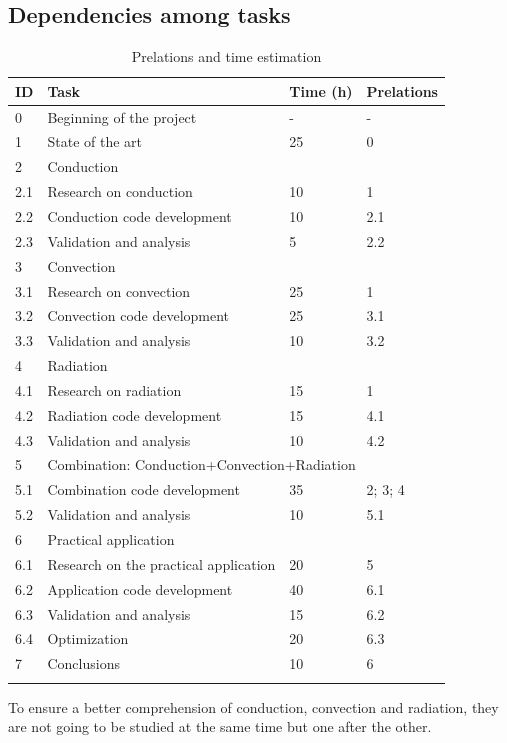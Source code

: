 \subsection{Dependencies among tasks}
\begin{longtable}{ | p{1.3cm} | p{7cm} | p{3cm} | p{3.5cm} |}
\hline

\textbf{ID }& \textbf{Task} & \textbf{Time (h)} & \textbf{Prelations} \\ \hline
0 & Beginning of the project & - & -  \\ \hline
1 & State of the art & 25 & 0 \\ \hline
2 & \multicolumn{3}{|l|}{Conduction} \\ \hline
2.1 & Research on conduction & 10 & 1 \\ \hline
2.2 & Conduction code development & 10 & 2.1 \\ \hline
2.3 & Validation and analysis & 5 & 2.2 \\ \hline
3 & \multicolumn{3}{|l|}{Convection} \\ \hline
3.1 & Research on convection & 25 & 1 \\ \hline
3.2 & Convection code development & 25 & 3.1 \\ \hline
3.3 & Validation and analysis & 10 & 3.2 \\ \hline
4 & \multicolumn{3}{|l|}{Radiation} \\ \hline
4.1 & Research on radiation & 15 & 1 \\ \hline
4.2 & Radiation code development & 15 & 4.1 \\ \hline
4.3 & Validation and analysis & 10 & 4.2 \\ \hline
5 & \multicolumn{3}{|l|}{Combination: Conduction+Convection+Radiation} \\ \hline
5.1 & Combination code development & 35 & 2; 3; 4 \\ \hline
5.2 & Validation and analysis & 10 & 5.1 \\ \hline
6 & \multicolumn{3}{|l|}{Practical application} \\ \hline
6.1 & Research on the practical application & 20 & 5 \\ \hline
6.2 & Application code development & 40 & 6.1  \\ \hline
6.3 & Validation and analysis & 15 & 6.2 \\ \hline
6.4 & Optimization  & 20 & 6.3 \\ \hline
7 & Conclusions & 10 & 6 \\ \hline
\caption{Prelations and time estimation} \\
\end{longtable}
To ensure a better comprehension of conduction, convection and radiation, they are not going to be studied at the same time but one after the other. 

